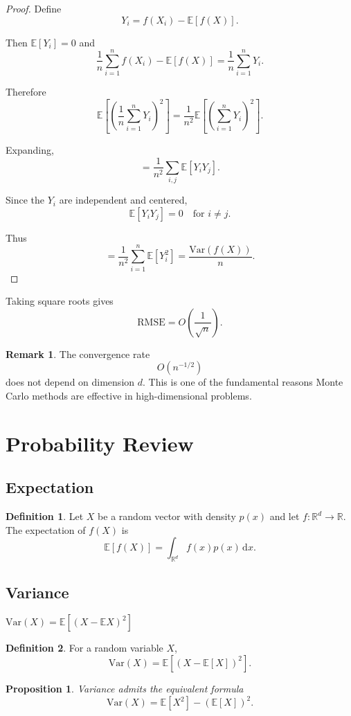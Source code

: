 \documentclass[12pt,oneside]{book}
\numberwithin{equation}{section}
\theoremstyle{definition}
\newtheorem{definition}{Definition}[section]
\newtheorem{remark}{Remark}[section]
\theoremstyle{plain}
\newtheorem{proposition}{Proposition}[section]
\theoremstyle{remark}
\newcommand{\R}{\mathbb{R}}
\newcommand{\E}{\mathbb{E}}
\newcommand{\Var}{\mathrm{Var}}
\newcommand{\dd}{\,\mathrm{d}}
\begin{document}
\begin{proof}
Define
\[
Y_i = f(X_i)-\E[f(X)].
\]

Then $\E[Y_i]=0$ and
\[
\frac{1}{n}\sum_{i=1}^n f(X_i)-\E[f(X)]
=
\frac{1}{n}\sum_{i=1}^n Y_i.
\]

Therefore
\[
\E\left[
\left(
\frac{1}{n}\sum_{i=1}^n Y_i
\right)^2
\right]
=
\frac{1}{n^2}
\E\left[
\left(
\sum_{i=1}^n Y_i
\right)^2
\right].
\]

Expanding,
\[
=
\frac{1}{n^2}
\sum_{i,j}\E[Y_iY_j].
\]

Since the $Y_i$ are independent and centered,
\[
\E[Y_iY_j]=0
\quad\text{for } i\neq j.
\]

Thus
\[
=
\frac{1}{n^2}
\sum_{i=1}^n \E[Y_i^2]
=
\frac{\Var(f(X))}{n}.
\]
\end{proof}

Taking square roots gives
\[
\mathrm{RMSE}
=
O\left(\frac{1}{\sqrt{n}}\right).
\]

\begin{remark}
The convergence rate
\[
O(n^{-1/2})
\]
does not depend on dimension $d$.
This is one of the fundamental reasons Monte Carlo methods are effective in high-dimensional problems.
\end{remark}

\section{Probability Review}

\subsection{Expectation}

\begin{definition}
Let $X$ be a random vector with density $p(x)$ and let $f:\R^d\to\R$. The expectation of $f(X)$ is
\[
\E[f(X)]
=
\int_{\R^d} f(x)p(x)\dd x.
\]
\end{definition}

\subsection{Variance}

$\mathrm{Var}(X)=\mathbb{E}[(X-\mathbb{E}X)^2]$

\begin{definition}
For a random variable $X$,
\[
\Var(X)
=
\E[(X-\E[X])^2].
\]
\end{definition}

\begin{proposition}
Variance admits the equivalent formula
\[
\Var(X)=\E[X^2]-(\E[X])^2.
\]
\end{proposition}
\end{document}
